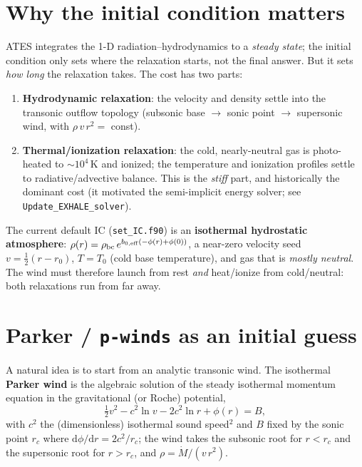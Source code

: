 \documentclass[english,a4paper]{my_memo}
\begin{document}
\section{Why the initial condition matters}
ATES integrates the 1-D radiation--hydrodynamics to a \emph{steady state}; the
initial condition only sets where the relaxation starts, not the final answer. But
it sets \emph{how long} the relaxation takes. The cost has two parts:
\begin{enumerate}\itemsep2pt
\item \textbf{Hydrodynamic relaxation}: the velocity and density settle into the
  transonic outflow topology (subsonic base $\to$ sonic point $\to$ supersonic
  wind, with $\rho\,v\,r^2=$ const).
\item \textbf{Thermal/ionization relaxation}: the cold, nearly-neutral gas is
  photo-heated to $\sim10^4$\,K and ionized; the temperature and ionization
  profiles settle to radiative/advective balance. This is the \emph{stiff} part,
  and historically the dominant cost (it motivated the semi-implicit energy solver;
  see \texttt{Update\_EXHALE\_solver}).
\end{enumerate}

The current default IC (\texttt{set\_IC.f90}) is an \textbf{isothermal hydrostatic
atmosphere}: $\rho(r)=\rho_{\rm bc}\,e^{b_{0,\rm eff}(-\phi(r)+\phi(0))}$, a near-zero
velocity seed $v=\tfrac12(r-r_0)$, $T=T_0$ (cold base temperature), and gas that is
\emph{mostly neutral}. The wind must therefore launch from rest \emph{and} heat/ionize
from cold/neutral: both relaxations run from far away.

\section{Parker / \texttt{p-winds} as an initial guess}
A natural idea is to start from an analytic transonic wind. The isothermal
\textbf{Parker wind} is the algebraic solution of the steady isothermal momentum
equation in the gravitational (or Roche) potential,
\begin{equation}
  \tfrac12 v^2 - c^2\ln v - 2c^2\ln r + \phi(r) = B ,
  \label{eq:bernoulli}
\end{equation}
with $c^2$ the (dimensionless) isothermal sound speed$^2$ and $B$ fixed by the
sonic point $r_c$ where $\mathrm d\phi/\mathrm dr = 2c^2/r_c$; the wind takes the
subsonic root for $r<r_c$ and the supersonic root for $r>r_c$, and
$\rho=\dot M/(v\,r^2)$.
\end{document}
